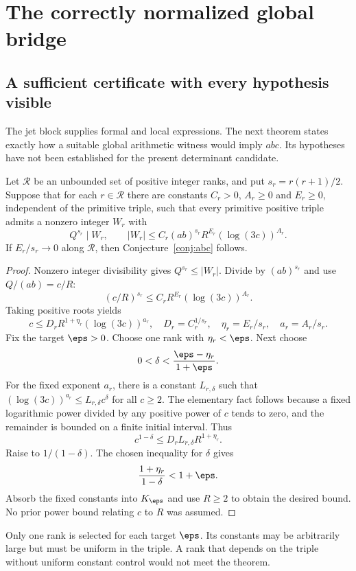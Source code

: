 \section{The correctly normalized global bridge}\label{sec:bridge}
\subsection{A sufficient certificate with every hypothesis visible}
The jet block supplies formal and local expressions. The next theorem states exactly how a suitable global arithmetic witness would imply $abc$. Its hypotheses have not been established for the present determinant candidate.

\begin{theorem}\label{thm:global-certificate}
Let $\mathcal R$ be an unbounded set of positive integer ranks, and put $s_r=r(r+1)/2$. Suppose that for each $r\in\mathcal R$ there are constants $C_r>0$, $A_r\ge0$ and $E_r\ge0$, independent of the primitive triple, such that every primitive positive triple admits a nonzero integer $W_r$ with
\[
 Q^{s_r}\mid W_r,
 \qquad |W_r|\le C_r(ab)^{s_r}R^{E_r}(\log(3c))^{A_r}.
\]
If $E_r/s_r\to0$ along $\mathcal R$, then Conjecture~\ref{conj:abc} follows.
\end{theorem}
\begin{proof}
Nonzero integer divisibility gives $Q^{s_r}\le|W_r|$. Divide by $(ab)^{s_r}$ and use $Q/(ab)=c/R$:
\[
 (c/R)^{s_r}\le C_rR^{E_r}(\log(3c))^{A_r}.
\]
Taking positive roots yields
\[
 c\le D_rR^{1+\eta_r}(\log(3c))^{a_r},
\quad D_r=C_r^{1/s_r},\quad \eta_r=E_r/s_r,\quad a_r=A_r/s_r.
\]
Fix the target $\eps>0$. Choose one rank with $\eta_r<\eps$. Next choose
\[
 0<\delta<\frac{\eps-\eta_r}{1+\eps}.
\]
For the fixed exponent $a_r$, there is a constant $L_{r,\delta}$ such that $(\log(3c))^{a_r}\le L_{r,\delta}c^\delta$ for all $c\ge2$. The elementary fact follows because a fixed logarithmic power divided by any positive power of $c$ tends to zero, and the remainder is bounded on a finite initial interval. Thus
\[
 c^{1-\delta}\le D_rL_{r,\delta}R^{1+\eta_r}.
\]
Raise to $1/(1-\delta)$. The chosen inequality for $\delta$ gives
\[
 \frac{1+\eta_r}{1-\delta}<1+\eps.
\]
Absorb the fixed constants into $K_\eps$ and use $R\ge2$ to obtain the desired bound. No prior power bound relating $c$ to $R$ was assumed.
\end{proof}
Only one rank is selected for each target $\eps$. Its constants may be arbitrarily large but must be uniform in the triple. A rank that depends on the triple without uniform constant control would not meet the theorem.

